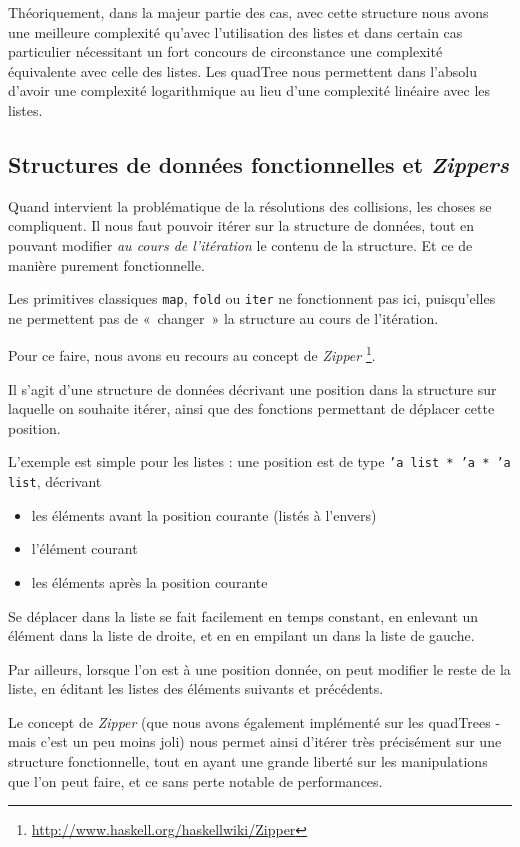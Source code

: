 \documentclass[a4paper]{scrartcl}
\begin{document}
Théoriquement, dans la majeur partie des cas, avec cette structure
nous avons une meilleure complexité qu'avec l'utilisation des listes
et dans certain cas particulier nécessitant un fort concours de
circonstance une complexité équivalente avec celle des listes. Les
quadTree nous permettent dans l'absolu d'avoir une complexité
logarithmique au lieu d'une complexité linéaire avec les listes.

\subsection{Structures de données fonctionnelles et \emph{Zippers}}

Quand intervient la problématique de la résolutions des collisions,
les choses se compliquent. Il nous faut pouvoir itérer sur la
structure de données, tout en pouvant modifier \emph{au cours de
  l'itération} le contenu de la structure. Et ce de manière purement
fonctionnelle.

Les primitives classiques \texttt{map}, \texttt{fold} ou \texttt{iter}
ne fonctionnent pas ici, puisqu'elles ne permettent pas de «~changer~»
la structure au cours de l'itération.

Pour ce faire, nous avons eu recours au concept de \emph{Zipper}
\footnote{\href{http://www.haskell.org/haskellwiki/Zipper}{http://www.haskell.org/haskellwiki/Zipper}}.

Il s'agit d'une structure de données décrivant une position dans la
structure sur laquelle on souhaite itérer, ainsi que des fonctions
permettant de déplacer cette position.

L'exemple est simple pour les listes : une position est de type
\texttt{'a list * 'a * 'a list}, décrivant 
\begin{itemize}
\item les éléments avant la position courante (listés à l'envers)
\item l'élément courant
\item les éléments après la position courante
\end{itemize}

Se déplacer dans la liste se fait facilement en temps constant, en
enlevant un élément dans la liste de droite, et en en empilant un dans
la liste de gauche.

Par ailleurs, lorsque l'on est à une position donnée, on peut modifier
le reste de la liste, en éditant les listes des éléments suivants et
précédents.

Le concept de \emph{Zipper} (que nous avons également implémenté sur
les quadTrees - mais c'est un peu moins joli) nous permet ainsi
d'itérer très précisément sur une structure fonctionnelle, tout en
ayant une grande liberté sur les manipulations que l'on peut faire, et
ce sans perte notable de performances.
\end{document}
